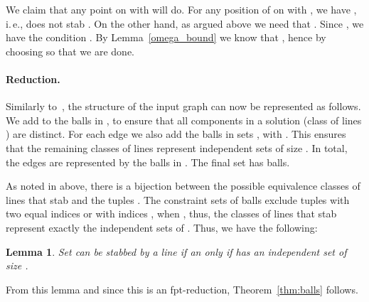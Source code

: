 \documentclass[12pt]{article}
\newtheorem{lemma}[definition]{Lemma}
\begin{document}
We claim that any point  on  with  will do.
For any position of  on  with , we have 
, 
i.\,e.,  does not stab . 
On the other hand, as argued above we need that .
Since , 
we have the condition . By Lemma~\ref{omega_bound} we know that 
, hence by choosing  
so that  
we are done.
\paragraph{Reduction.}
Similarly to~\cite{CGKR08}, the structure of the input graph  can now be represented as follows.
We add to  the  balls in 
, to ensure that 
all components  in a solution (class of lines ) are distinct. 
For each edge  we also add the balls in  sets , with .
This ensures that the remaining classes of lines  represent independent sets of size .
In total, the edges are represented by the  balls in 
.
The final set  has  balls.

As noted in above, there is a bijection between the possible equivalence classes of lines  that 
stab  and the tuples . The constraint sets of balls exclude tuples with two equal indices 
 or with indices ,  when , thus, the classes of lines that stab  represent exactly the independent 
sets of . Thus, we have the following:
\begin{lemma}
Set  can be stabbed by a line if an only if  has an independent set of size .
\end{lemma}
From this lemma and since this is an fpt-reduction, Theorem~\ref{thm:balls} follows.
 




\end{document}
